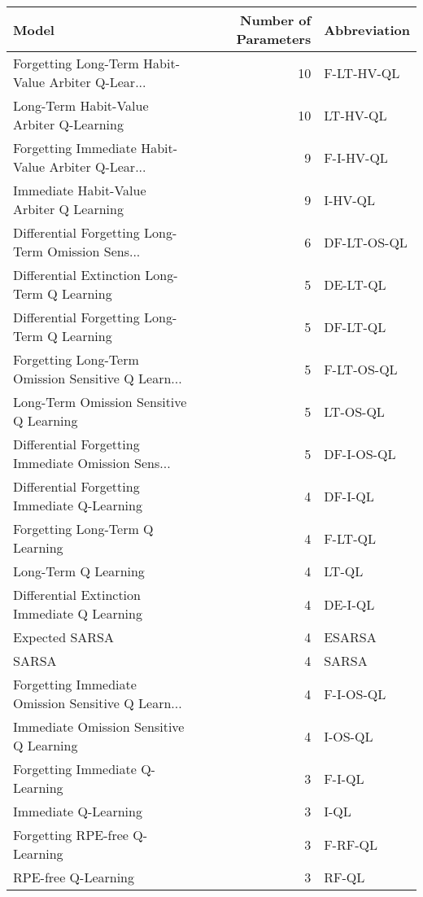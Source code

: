 \begin{tabular}{lrl}
\toprule
                                             Model &  Number of Parameters & Abbreviation \\
\midrule
Forgetting Long-Term Habit-Value Arbiter Q-Lear... &                    10 &   F-LT-HV-QL \\
          Long-Term Habit-Value Arbiter Q-Learning &                    10 &     LT-HV-QL \\
Forgetting Immediate Habit-Value Arbiter Q-Lear... &                     9 &    F-I-HV-QL \\
          Immediate Habit-Value Arbiter Q Learning &                     9 &      I-HV-QL \\
Differential Forgetting Long-Term Omission Sens... &                     6 &  DF-LT-OS-QL \\
      Differential Extinction Long-Term Q Learning &                     5 &     DE-LT-QL \\
      Differential Forgetting Long-Term Q Learning &                     5 &     DF-LT-QL \\
Forgetting Long-Term Omission Sensitive Q Learn... &                     5 &   F-LT-OS-QL \\
          Long-Term Omission Sensitive Q Learning  &                     5 &     LT-OS-QL \\
Differential Forgetting Immediate Omission Sens... &                     5 &   DF-I-OS-QL \\
      Differential Forgetting Immediate Q-Learning &                     4 &      DF-I-QL \\
                   Forgetting Long-Term Q Learning &                     4 &      F-LT-QL \\
                              Long-Term Q Learning &                     4 &        LT-QL \\
      Differential Extinction Immediate Q Learning &                     4 &      DE-I-QL \\
                                    Expected SARSA &                     4 &       ESARSA \\
                                             SARSA &                     4 &        SARSA \\
Forgetting Immediate Omission Sensitive Q Learn... &                     4 &    F-I-OS-QL \\
          Immediate Omission Sensitive Q Learning  &                     4 &      I-OS-QL \\
                   Forgetting Immediate Q-Learning &                     3 &       F-I-QL \\
                              Immediate Q-Learning &                     3 &         I-QL \\
                    Forgetting RPE-free Q-Learning &                     3 &      F-RF-QL \\
                               RPE-free Q-Learning &                     3 &        RF-QL \\
\bottomrule
\end{tabular}
